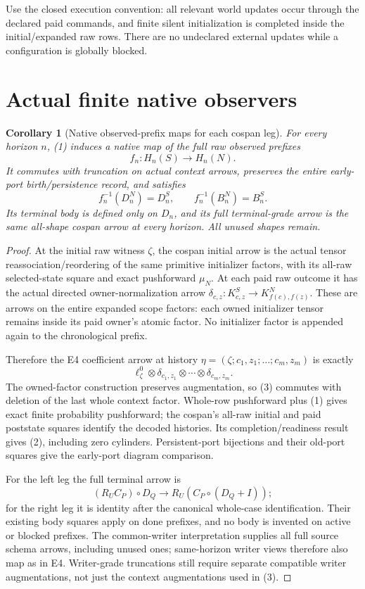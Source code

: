 \documentclass[11pt]{article}
\newtheorem{corollary}{Corollary}
\begin{document}
Use the closed execution convention: all relevant world updates occur through the declared paid commands, and finite silent initialization is completed inside the initial/expanded raw rows. There are no undeclared external updates while a configuration is globally blocked.

\section{Actual finite native observers}
\begin{corollary}[Native observed-prefix maps for each cospan leg]
For every horizon $n$, (1) induces a native map of the full raw observed prefixes
\[
                     f_n:H_n(S)\longrightarrow H_n(N).
\]
It commutes with truncation on actual context arrows, preserves the entire early-port birth/persistence record, and satisfies
\[
 f_n^{-1}(D_n^N)=D_n^S,\qquad f_n^{-1}(B_n^N)=B_n^S.  \tag{2}
\]
Its terminal body is defined only on $D_n$, and its full terminal-grade arrow is the same all-shape cospan arrow at every horizon. All unused shapes remain.
\end{corollary}
\begin{proof}
At the initial raw witness $\zeta$, the cospan initial arrow is the actual tensor reassociation/reordering of the same primitive initializer factors, with its all-raw selected-state square and exact pushforward $\mu_N$. At each paid raw outcome it has the actual directed owner-normalization arrow
$\delta_{c,z}:K^S_{c,z}\to K^N_{f(c),f(z)}$.
These are arrows on the entire expanded scope factors: each owned initializer tensor remains inside its paid owner's atomic factor. No initializer factor is appended again to the chronological prefix.

Therefore the E4 coefficient arrow at history $\eta=(\zeta;c_1,z_1;\ldots;c_m,z_m)$ is exactly
\[
       \ell^0_\zeta\otimes\delta_{c_1,z_1}\otimes\cdots
                                      \otimes\delta_{c_m,z_m}. \tag{3}
\]
The owned-factor construction preserves augmentation, so (3) commutes with deletion of the last whole context factor. Whole-row pushforward plus (1) gives exact finite probability pushforward; the cospan's all-raw initial and paid poststate squares identify the decoded histories. Its completion/readiness result gives (2), including zero cylinders. Persistent-port bijections and their old-port squares give the early-port diagram comparison.

For the left leg the full terminal arrow is
\[
 (R_U C_P)\circ D_Q\longrightarrow R_U(C_P\circ(D_Q+I));
\]
for the right leg it is identity after the canonical whole-case identification. Their existing body squares apply on done prefixes, and no body is invented on active or blocked prefixes. The common-writer interpretation supplies all full source schema arrows, including unused ones; same-horizon writer views therefore also map as in E4. Writer-grade truncations still require separate compatible writer augmentations, not just the context augmentations used in (3).\end{proof}
\end{document}
